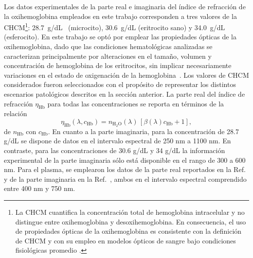 Los datos experimentales de la parte real e imaginaria del índice de refracción de la oxihemoglobina empleados en este trabajo corresponden a tres valores de la CHCM\footnote{La CHCM cuantifica la concentración total de hemoglobina intracelular y no distingue entre oxihemoglobina y desoxihemoglobina. En consecuencia, el uso de propiedades ópticas de la oxihemoglobina es consistente con la definición de CHCM y con su empleo en modelos ópticos de sangre bajo condiciones fisiológicas promedio \cite{bosschaartLiteratureReviewNovel2014}.}: 28.7~g/dL~\cite{friebelModelFunctionCalculate2006} (microcito), 30.6~g/dL \cite{friebelDeterminationComplexRefractive2005} (eritrocito sano) y 34.0~g/dL \cite{friebelDeterminationComplexRefractive2005} (esferocito). En este trabajo se optó por emplear las propiedades ópticas de la oxihemoglobina, dado que las condiciones hematológicas analizadas se caracterizan principalmente por alteraciones en el tamaño, volumen y concentración de hemoglobina de los eritrocitos, sin implicar necesariamente variaciones en el estado de oxigenación de la hemoglobina~\cite{keohaneRodaksHematologyClinical2015}. Los valores de CHCM considerados fueron seleccionados con el propósito de representar los distintos escenarios patológicos descritos en la sección anterior. La parte real del índice de refracción $\eta_{\text{Hb}}$ para todas las concentraciones se reporta en términos de la relación \cite{friebelModelFunctionCalculate2006}
%
\begin{equation}
	\eta_{\text{Hb}}(\lambda,c_{\text{Hb}})=n_{\text{H}_{2}\text{O}}(\lambda)\,[\beta(\lambda)c_{\text{Hb}}+1],
	\label{eq:IR_eri}
\end{equation}
%
 de $n_{\text{Hb}}$ con $c_{\text{Hb}}$. En cuanto a la parte imaginaria, para la concentración de 28.7 g/dL se dispone de datos en el intervalo espectral de 250 nm a 1100 nm. En contraste, para las concentraciones de 30.6 g/dL y 34 g/dL la información experimental de la parte imaginaria sólo está disponible en el rango de 300 a 600 nm. Para el plasma, se emplearon los datos de la parte real reportados en la Ref. \cite{liuMeasurementRefractiveIndex2019} y de la parte imaginaria en la Ref.~\cite{meinkeOpticalPropertiesPlatelets2007}, ambos en el intervalo espectral comprendido entre 400 nm y 750 nm.
